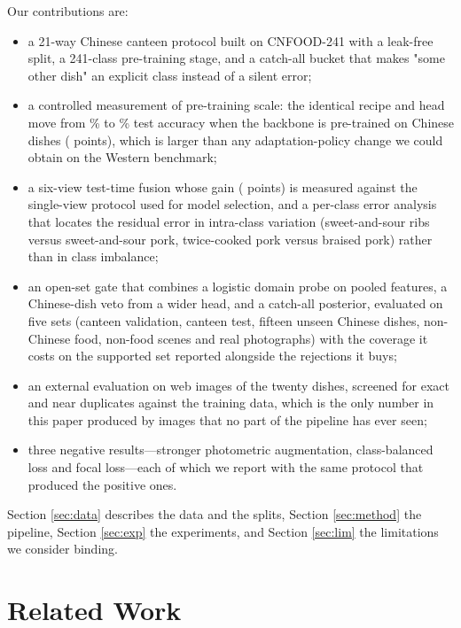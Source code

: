 \documentclass[conference]{IEEEtran}
\begin{document}
Our contributions are:
\begin{itemize}
\item a 21-way Chinese canteen protocol built on CNFOOD-241 \cite{cnfood241}
with a leak-free split, a 241-class pre-training stage, and a catch-all bucket
that makes "some other dish" an explicit class instead of a silent error;
\item a controlled measurement of pre-training scale: the identical recipe and
head move from \cnNoPreTest\% to \cnTest\% test accuracy when the backbone is
pre-trained on Chinese dishes (\cnGainPretrain{} points), which is larger than
any adaptation-policy change we could obtain on the Western benchmark;
\item a six-view test-time fusion whose gain (\cnFuseGain{} points) is measured
against the single-view protocol used for model selection, and a per-class error
analysis that locates the residual error in intra-class variation
(sweet-and-sour ribs versus sweet-and-sour pork, twice-cooked pork versus
braised pork) rather than in class imbalance;
\item an open-set gate that combines a logistic domain probe on pooled features,
a Chinese-dish veto from a wider head, and a catch-all posterior, evaluated on
five sets (canteen validation, canteen test, fifteen unseen Chinese dishes,
non-Chinese food, non-food scenes and real photographs) with the coverage it
costs on the supported set reported alongside the rejections it buys;
\item an external evaluation on \webN{} web images of the twenty dishes,
screened for exact and near duplicates against the training data, which is the
only number in this paper produced by images that no part of the pipeline has
ever seen;
\item three negative results---stronger photometric augmentation,
class-balanced loss and focal loss---each of which we report with the same
protocol that produced the positive ones.
\end{itemize}

Section \ref{sec:data} describes the data and the splits, Section
\ref{sec:method} the pipeline, Section \ref{sec:exp} the experiments, and
Section \ref{sec:lim} the limitations we consider binding.

\section{Related Work}
\end{document}
